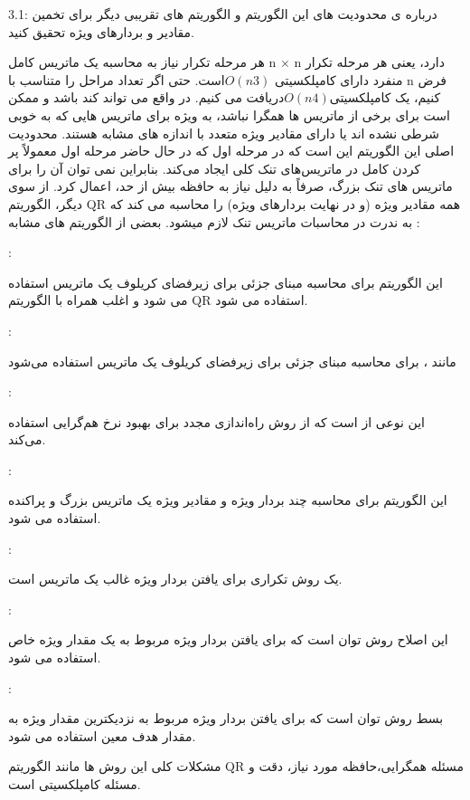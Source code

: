3.1:
درباره ی محدودیت های این الگوریتم و الگوریتم های تقریبی دیگر برای تخمین مقادیر و بردارهای ویژه تحقیق کنید.

هر مرحله تکرار نیاز به محاسبه 
یک ماتریس کامل n × n دارد، یعنی هر مرحله تکرار منفرد دارای کامپلکسیتی $O(n3) $است. حتی اگر تعداد مراحل را متناسب با n فرض کنیم، یک کامپلکسیتی$ O(n4) $دریافت می کنیم.
در واقع می تواند کند باشد و ممکن است برای برخی از ماتریس ها همگرا نباشد، به ویژه برای ماتریس هایی که به خوبی شرطی نشده اند یا دارای مقادیر ویژه متعدد با اندازه های مشابه هستند. 
محدودیت اصلی این الگوریتم این است که در مرحله اول که در حال حاضر مرحله اول معمولاً پر کردن کامل در ماتریس‌های تنک کلی ایجاد می‌کند. بنابراین نمی توان آن را برای ماتریس های تنک بزرگ، صرفاً به دلیل نیاز به حافظه بیش از حد، اعمال کرد. از سوی دیگر، الگوریتم QR همه مقادیر ویژه (و در نهایت بردارهای ویژه) را محاسبه می کند که به ندرت در محاسبات ماتریس تنک لازم میشود.
بعضی از الگوریتم های مشابه
 :


:


 این الگوریتم برای محاسبه مبنای جزئی برای زیرفضای کریلوف یک ماتریس استفاده می شود و اغلب همراه با الگوریتم QR استفاده می شود.

 :

مانند
،
برای محاسبه مبنای جزئی برای زیرفضای کریلوف یک ماتریس استفاده می‌شود


:

این نوعی از
 است که از روش راه‌اندازی مجدد برای بهبود نرخ هم‌گرایی استفاده می‌کند.

:

 این الگوریتم برای محاسبه چند بردار ویژه و مقادیر ویژه یک ماتریس بزرگ و پراکنده استفاده می شود.

: 

  یک روش تکراری برای یافتن بردار ویژه غالب یک ماتریس است.

: 

این اصلاح روش توان است که برای یافتن بردار ویژه مربوط به یک مقدار ویژه خاص استفاده می شود.

:

 بسط روش توان است که برای یافتن بردار ویژه مربوط به نزدیکترین مقدار ویژه به مقدار هدف معین استفاده می شود. 

مشکلات کلی این روش ها مانند الگوریتم QR مسئله همگرایی،حافظه مورد نیاز، دقت و مسئله کامپلکسیتی است.



